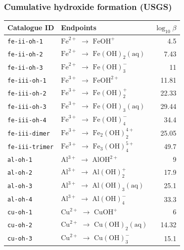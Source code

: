 \documentclass[a4paper,11pt]{ltxdoc}
\begin{document}
\subsubsection{Cumulative hydroxide formation (USGS)}
\begin{longtable}{@{}>{\raggedright\arraybackslash}p{42mm}p{87mm}r@{}}
Catalogue ID & Endpoints & $\log_{10}\beta$\\\hline
\endhead
\texttt{fe-ii-oh-1} & $\mathrm{Fe}^{2+}$ $\to$ $\mathrm{Fe}\mathrm{O}\mathrm{H}^{+}$ & 4.5\\
\texttt{fe-ii-oh-2} & $\mathrm{Fe}^{2+}$ $\to$ $\mathrm{Fe}(\mathrm{O}\mathrm{H})_{2}\mathrm{(aq)}$ & 7.43\\
\texttt{fe-ii-oh-3} & $\mathrm{Fe}^{2+}$ $\to$ $\mathrm{Fe}(\mathrm{O}\mathrm{H})_{3}^{-}$ & 11\\
\texttt{fe-iii-oh-1} & $\mathrm{Fe}^{3+}$ $\to$ $\mathrm{Fe}\mathrm{O}\mathrm{H}^{2+}$ & 11.81\\
\texttt{fe-iii-oh-2} & $\mathrm{Fe}^{3+}$ $\to$ $\mathrm{Fe}(\mathrm{O}\mathrm{H})_{2}^{+}$ & 22.33\\
\texttt{fe-iii-oh-3} & $\mathrm{Fe}^{3+}$ $\to$ $\mathrm{Fe}(\mathrm{O}\mathrm{H})_{3}\mathrm{(aq)}$ & 29.44\\
\texttt{fe-iii-oh-4} & $\mathrm{Fe}^{3+}$ $\to$ $\mathrm{Fe}(\mathrm{O}\mathrm{H})_{4}^{-}$ & 34.4\\
\texttt{fe-iii-dimer} & $\mathrm{Fe}^{3+}$ $\to$ $\mathrm{Fe}_{2}(\mathrm{O}\mathrm{H})_{2}^{4+}$ & 25.05\\
\texttt{fe-iii-trimer} & $\mathrm{Fe}^{3+}$ $\to$ $\mathrm{Fe}_{3}(\mathrm{O}\mathrm{H})_{4}^{5+}$ & 49.7\\
\texttt{al-oh-1} & $\mathrm{Al}^{3+}$ $\to$ $\mathrm{Al}\mathrm{O}\mathrm{H}^{2+}$ & 9\\
\texttt{al-oh-2} & $\mathrm{Al}^{3+}$ $\to$ $\mathrm{Al}(\mathrm{O}\mathrm{H})_{2}^{+}$ & 17.9\\
\texttt{al-oh-3} & $\mathrm{Al}^{3+}$ $\to$ $\mathrm{Al}(\mathrm{O}\mathrm{H})_{3}\mathrm{(aq)}$ & 25.1\\
\texttt{al-oh-4} & $\mathrm{Al}^{3+}$ $\to$ $\mathrm{Al}(\mathrm{O}\mathrm{H})_{4}^{-}$ & 33.3\\
\texttt{cu-oh-1} & $\mathrm{Cu}^{2+}$ $\to$ $\mathrm{Cu}\mathrm{O}\mathrm{H}^{+}$ & 6\\
\texttt{cu-oh-2} & $\mathrm{Cu}^{2+}$ $\to$ $\mathrm{Cu}(\mathrm{O}\mathrm{H})_{2}\mathrm{(aq)}$ & 14.32\\
\texttt{cu-oh-3} & $\mathrm{Cu}^{2+}$ $\to$ $\mathrm{Cu}(\mathrm{O}\mathrm{H})_{3}^{-}$ & 15.1\\

\end{longtable}
\end{document}
